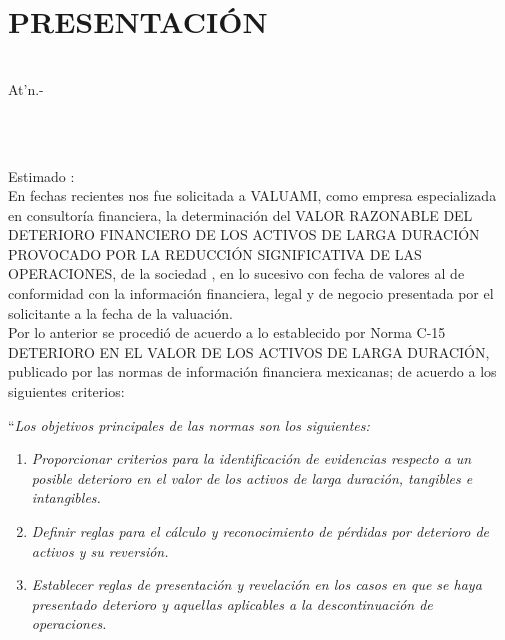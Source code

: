 \section*{PRESENTACIÓN}

\textcolor{principal}{\empresaSolicitante}\\ 

\textcolor{principal}{At'n.- \personaSolicitante}\\ 
\textcolor{principal}{\caracterSolicitante}\\

\begin{minipage}{.4\textwidth}
\ubicacionBien\\[10pt]
\end{minipage}


Estimado \textcolor{principal}{\personaSolicitante}:\\[10pt]

En fechas recientes nos fue solicitada a \textcolor{principal}{VALUAMI}, como empresa especializada en consultoría financiera, la determinación del \textcolor{principal}{VALOR RAZONABLE DEL DETERIORO FINANCIERO DE LOS ACTIVOS DE LARGA DURACIÓN PROVOCADO POR LA REDUCCIÓN SIGNIFICATIVA DE LAS OPERACIONES},  de la sociedad \textcolor{principal}{\empresaSolicitante}, en lo sucesivo \textcolor{principal}{\empresaCorto} con fecha de valores al \textcolor{principal}{\fechaValores} de conformidad con la información financiera, legal y de negocio presentada por el solicitante a la fecha de la valuación.\\


Por lo anterior se procedió de acuerdo a lo establecido por \textcolor{principal}{Norma C-15 DETERIORO EN EL VALOR DE LOS ACTIVOS DE LARGA DURACIÓN}, publicado por las normas de información financiera mexicanas; de acuerdo a los siguientes criterios:

``\textit{Los objetivos principales de las normas son los siguientes:}\\

\begin{enumerate}[\itshape (a)]

\item \textit{Proporcionar criterios para la identificación de evidencias respecto a un posible deterioro en el valor de los activos de larga duración, tangibles e intangibles.}

\item \textit{Definir reglas para el cálculo y reconocimiento de pérdidas por deterioro de activos y su reversión.}

\item \textit{Establecer reglas de presentación y revelación en los casos en que se haya presentado deterioro y aquellas aplicables a la descontinuación de operaciones.}
\end{enumerate}


